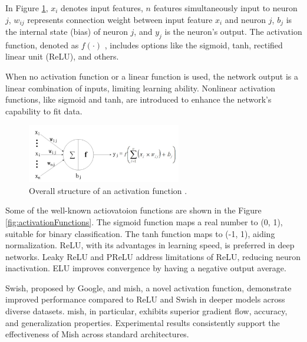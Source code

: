In Figure \ref{fig:activationFunctionStructure}, $x_i$ denotes input features, $n$ features simultaneously input to neuron $j$, $w_{ij}$ represents connection weight between input feature $x_i$ and neuron $j$, $b_j$ is the internal state (bias) of neuron $j$, and $y_j$ is the neuron's output. The activation function, denoted as $f(·)$ , includes options like the sigmoid, tanh, rectified linear unit (ReLU), and others.

When no activation function or a linear function is used, the network output is a linear combination of inputs, limiting learning ability. Nonlinear activation functions, like sigmoid and tanh, are introduced to enhance the network's capability to fit data.

\begin{figure}[h!]
	\centering
	\includegraphics[width=0.6\textwidth]{Images/DataMining/activationFunctionStructure}
	\caption{Overall structure of an activation function \cite{Li:2021}.} \label{fig:activationFunctionStructure}
\end{figure}

Some of the well-known actiovatoion functions are shown in the Figure \ref{fig:activationFunctions}. The sigmoid function maps a real number to (0, 1), suitable for binary classification. The tanh function maps to (-1, 1), aiding normalization. ReLU, with its advantages in learning speed, is preferred in deep networks. Leaky ReLU and PReLU address limitations of ReLU, reducing neuron inactivation. ELU improves convergence by having a negative output average.

Swish, proposed by Google, and mish, a novel activation function, demonstrate improved performance compared to ReLU and Swish in deeper models across diverse datasets. mish, in particular, exhibits superior gradient flow, accuracy, and generalization properties. Experimental results consistently support the effectiveness of Mish across standard architectures.

